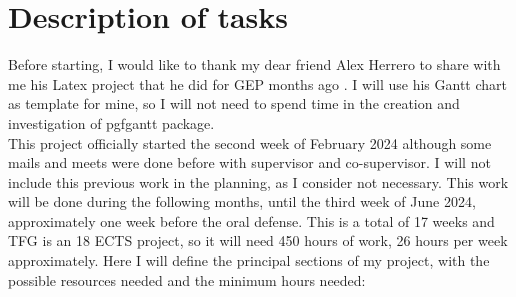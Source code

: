 \chapter{Description of tasks}
Before starting, I would like to thank my dear friend Alex Herrero to share with me his Latex project that he did for GEP months ago \cite{herrero_facultat_nodate}.
I will use his Gantt chart as template for mine, so I will not need to spend time in the creation and investigation of pgfgantt package. \\

This project officially started the second week of February 2024 although some mails and meets were done before with supervisor and co-supervisor.
I will not include this previous work in the planning, as I consider not necessary.
This work will be done during the following months, until the third week of June 2024, approximately one week before the oral defense.
This is a total of 17 weeks and TFG is an 18 ECTS project, so it will need 450 hours of work, 26 hours per week approximately.
Here I will define the principal sections of my project, with the possible resources needed and the minimum hours needed:

